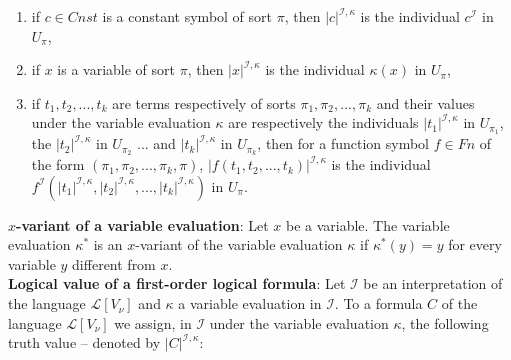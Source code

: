 \documentclass[margin=0px]{article}
\begin{document}
\begin{enumerate}
    \item	if $c \in Cnst$ is a constant symbol of sort $\pi$, then $|c|^{\mathcal{I},\kappa}$ is the individual $c^{\mathcal{I}}$ in $U_{\pi}$,

    \item	if $x$ is a variable of sort $\pi$, then $|x|^{\mathcal{I},\kappa}$ is the individual $\kappa(x)$ in $U_{\pi}$,

    \item	if $t_{1}, t_{2}, ..., t_{k}$ are terms respectively of sorts $\pi_{1}, \pi_{2}, ..., \pi_{k}$ and their values
          under the variable evaluation $\kappa$ are respectively the individuals $|t_{1}|^{\mathcal{I},\kappa}$ in $U_{\pi_{1}}$, the
          $|t_{2}|^{\mathcal{I},\kappa}$ in $U_{\pi_{2}}$ ... and $|t_{k}|^{\mathcal{I},\kappa}$ in $U_{\pi_{k}}$,
          then for a function symbol $f \in Fn$ of the form $(\pi_{1}, \pi_{2}, ..., \pi_{k}, \pi)$,
          $|f(t_{1}, t_{2}, ..., t_{k})|^{\mathcal{I},\kappa}$ is the individual
          $f^{\mathcal{I}}(|t_{1}|^{\mathcal{I},\kappa}, |t_{2}|^{\mathcal{I},\kappa}, ..., |t_{k}|^{\mathcal{I},\kappa})$ in $U_{\pi}$.

\end{enumerate}

\noindent \textbf{$x$-variant of a variable evaluation}: Let $x$ be a variable. The variable evaluation $\kappa^{*}$ is an
$x$-variant of the variable evaluation $\kappa$ if $\kappa^{*}(y) = y$ for every variable $y$ different from $x$.\\

\noindent \textbf{Logical value of a first-order logical formula}:
Let $\mathcal{I}$ be an interpretation of the language $\mathcal{L}[V_{\nu}]$ and $\kappa$ a variable evaluation in $\mathcal{I}$.
To a formula $C$ of the language $\mathcal{L}[V_{\nu}]$ we assign, in $\mathcal{I}$ under the variable evaluation $\kappa$,
the following truth value -- denoted by $|C|^{\mathcal{I},\kappa}$:
\end{document}
